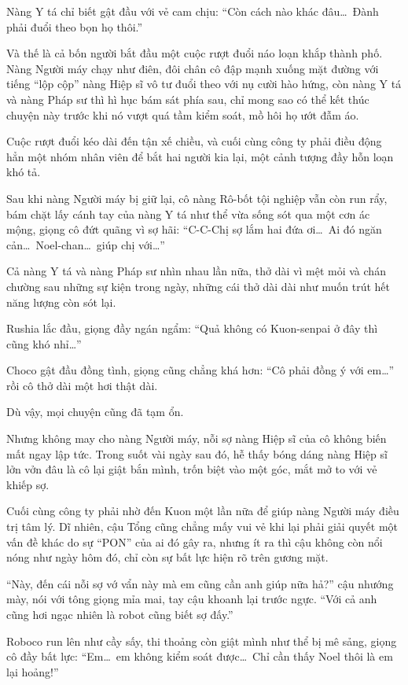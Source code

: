 \documentclass[../main.tex]{subfiles}
\begin{document}
Nàng Y tá chỉ biết gật đầu với vẻ cam chịu: ``Còn cách nào khác đâu\dots\ Đành phải đuổi theo bọn họ thôi.''

Và thế là cả bốn người bắt đầu một cuộc rượt đuổi náo loạn khắp thành phố. Nàng Người máy chạy như điên, đôi chân cô đập mạnh xuống mặt đường với tiếng ``lộp cộp'' nàng Hiệp sĩ vô tư đuổi theo với nụ cười hào hứng, còn nàng Y tá và nàng Pháp sư thì hì hục bám sát phía sau, chỉ mong sao có thể kết thúc chuyện này trước khi nó vượt quá tầm kiểm soát, mồ hôi họ ướt đẫm áo.

Cuộc rượt đuổi kéo dài đến tận xế chiều, và cuối cùng công ty phải điều động hẳn một nhóm nhân viên để bắt hai người kia lại, một cảnh tượng đầy hỗn loạn khó tả.

Sau khi nàng Người máy bị giữ lại, cô nàng Rô-bốt tội nghiệp vẫn còn run rẩy, bám chặt lấy cánh tay của nàng Y tá như thể vừa sống sót qua một cơn ác mộng, giọng cô đứt quãng vì sợ hãi: ``C-C-Chị sợ lắm hai đứa ơi\dots\ Ai đó ngăn cản\dots\ Noel-chan\dots\ giúp chị với\dots''

Cả nàng Y tá và nàng Pháp sư nhìn nhau lần nữa, thở dài vì mệt mỏi và chán chường sau những sự kiện trong ngày, những cái thở dài dài như muốn trút hết năng lượng còn sót lại.

Rushia lắc đầu, giọng đầy ngán ngẩm: ``Quả không có Kuon-senpai ở đây thì cũng khó nhỉ\dots''

Choco gật đầu đồng tình, giọng cũng chẳng khá hơn: ``Cô phải đồng ý với em\dots'' rồi cô thở dài một hơi thật dài.

Dù vậy, mọi chuyện cũng đã tạm ổn.

Nhưng không may cho nàng Người máy, nỗi sợ nàng Hiệp sĩ của cô không biến mất ngay lập tức. Trong suốt vài ngày sau đó, hễ thấy bóng dáng nàng Hiệp sĩ lởn vởn đâu là cô lại giật bắn mình, trốn biệt vào một góc, mắt mở to với vẻ khiếp sợ.

Cuối cùng công ty phải nhờ đến Kuon một lần nữa để giúp nàng Người máy điều trị tâm lý. Dĩ nhiên, cậu Tổng cũng chẳng mấy vui vẻ khi lại phải giải quyết một vấn đề khác do sự ``PON'' của ai đó gây ra, nhưng ít ra thì cậu không còn nổi nóng như ngày hôm đó, chỉ còn sự bất lực hiện rõ trên gương mặt.

``Này, đến cái nỗi sợ vớ vẩn này mà em cũng cần anh giúp nữa hả?'' cậu nhướng mày, nói với tông giọng mỉa mai, tay cậu khoanh lại trước ngực. ``Với cả anh cũng hơi ngạc nhiên là robot cũng biết sợ đấy.''

Roboco run lên như cầy sấy, thi thoảng còn giật mình như thể bị mê sảng, giọng cô đầy bất lực: ``Em\dots\ em không kiểm soát được\dots\ Chỉ cần thấy Noel thôi là em lại hoảng!''
\end{document}
